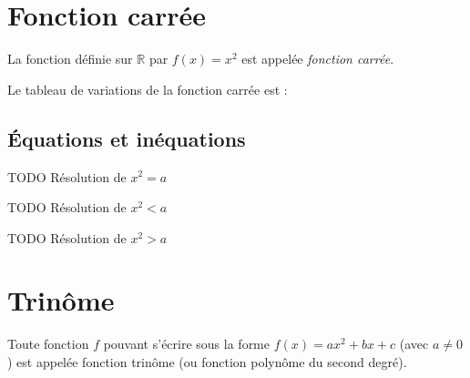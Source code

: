 \section{Fonction carrée}

\begin{definition}
  La fonction définie sur $\mathbb R$ par $f(x)=x^2$ est appelée \emph{fonction carrée}.
\end{definition}

\begin{propriete}[Variations]
  Le tableau de variations de la fonction carrée est :
  \begin{center}
    \hfill
  \end{center}

\end{propriete}

\subsection{Équations et inéquations}

\begin{propriete}
  TODO Résolution de $x^2=a$
\end{propriete}

\begin{propriete}
  TODO Résolution de $x^2<a$

  TODO Résolution de $x^2>a$
\end{propriete}

\section{Trinôme}

\begin{definition}
  Toute fonction $f$ pouvant s'écrire sous la forme $f(x)=ax^2+bx+c$ (avec $a\neq0$) est appelée fonction trinôme (ou fonction polynôme du second degré).
\end{definition}

